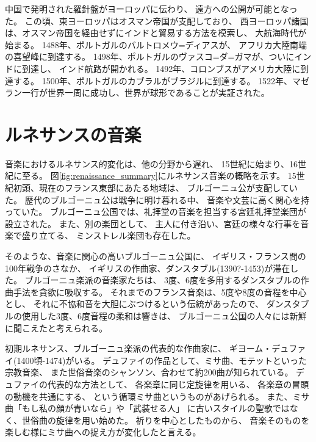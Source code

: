 \documentclass[a4j]{jarticle}
\begin{document}
中国で発明された羅針盤がヨーロッパに伝わり、
遠方への公開が可能となった。
この頃、東ヨーロッパはオスマン帝国が支配しており、
西ヨーロッパ諸国は、オスマン帝国を経由せずにインドと貿易する方法を模索し、
大航海時代が始まる。
1488年、ポルトガルのバルトロメウ=ディアスが、
アフリカ大陸南端の喜望峰に到達する。
1498年、ポルトガルのヴァスコ=ダ=ガマが、ついにインドに到達し、
インド航路が開かれる。
1492年、コロンブスがアメリカ大陸に到達する。
1500年、ポルトガルのカブラルがブラジルに到達する。
1522年、マゼラン一行が世界一周に成功し、世界が球形であることが実証された。





\section{ルネサンスの音楽}

音楽におけるルネサンス的変化は、他の分野から遅れ、
15世紀に始まり、16世紀に至る。
図\ref{fig:renaissance_summary}にルネサンス音楽の概略を示す。
15世紀初頭、現在のフランス東部にあたる地域は、
ブルゴーニュ公が支配していた。
歴代のブルゴーニュ公は戦争に明け暮れる中、
音楽や文芸に高く関心を持っていた。
ブルゴーニュ公国では、礼拝堂の音楽を担当する宮廷礼拝堂楽団が設立された。
また、別の楽団として、
主人に付き沿い、宮廷の様々な行事を音楽で盛り立てる、
ミンストレル楽団も存在した。

そのような、音楽に関心の高いブルゴーニュ公国に、
イギリス・フランス間の100年戦争のさなか、
イギリスの作曲家、ダンスタブル(1390?-1453)が滞在した。
ブルゴーニュ楽派の音楽家たちは、
3度、6度を多用するダンスタブルの作曲手法を貪欲に吸収する。
それまでのフランス音楽は、5度や8度の音程を中心とし、
それに不協和音を大胆にぶつけるという伝統があったので、
ダンスタブルの使用した3度、6度音程の柔和は響きは、
ブルゴーニュ公国の人々には新鮮に聞こえたと考えられる。

初期ルネサンス、ブルゴーニュ楽派の代表的な作曲家に、
ギヨーム・デュファイ(1400頃-1474)がいる。
デュファイの作品として、ミサ曲、モテットといった宗教音楽、
また世俗音楽のシャンソン、合わせて約200曲が知られている。
デュファイの代表的な方法として、
各楽章に同じ定旋律を用いる、
各楽章の冒頭の動機を共通にする、
という循環ミサ曲というものがあげられる。
また、ミサ曲「もし私の顔が青いなら」や「武装せる人」
に古いスタイルの聖歌ではなく、世俗曲の旋律を用い始めた。
祈りを中心としたものから、
音楽そのものを楽しむ様にミサ曲への捉え方が変化したと言える。
\end{document}
